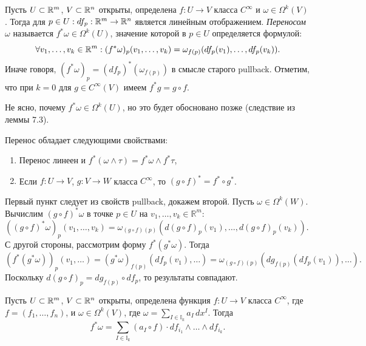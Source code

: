 \begin{definition}
	Пусть $U \subset \mathbb{R}^m$, $V \subset \mathbb{R}^n$ открыты, определена $f : U \to V$ класса $C^{\infty}$ и $\omega \in \Omega^k(V)$. 
	Тогда для $p \in U : df_p : \mathbb{R}^m \to \mathbb{R}^n$ является линейным отображением. 
	\textit{Переносом} $\omega$ называется $f^* \omega \in \Omega^k(U)$, значение которой в $p \in U$ определяется формулой: 
	\[\forall v_1, \dotsc, v_k \in \mathbb{R}^m : (f^* \omega)_p (v_1, \dotsc, v_k) = \omega_{f(p)} (df_p(v_1), \dotsc, df_p(v_k)). \]
	Иначе говоря, $(f^* \omega)_p = (df_p)^* (\omega_{f(p)})$ в смысле старого pullback.
	Отметим, что при $k = 0$ для $g \in C^{\infty}(V)$ имеем $f^* g = g \circ f$.
\end{definition}

Не ясно, почему $f^* \omega \in \Omega^k(U)$, но это будет обосновано позже (следствие из леммы 7.3).

\begin{note}
	Перенос обладает следующими свойствами:
	\begin{enumerate}[itemsep = 0pt, topsep  =5pt]
		\item Перенос линеен и $f^*(\omega \wedge \tau) = f^* \omega \wedge f^* \tau$, 
		\item Если $f : U \to V$, $g : V \to W$ класса $C^\infty$, то $(g \circ f)^* = f^* \circ g^*$.
	\end{enumerate}
\end{note}

\begin{myproof}
	Первый пункт следует из свойств pullback, докажем второй.
	Пусть $\omega \in \Omega^k(W)$. Вычислим $(g \circ f)^* \omega$ в точке $p \in U$ на $v_1, \dots, v_k \in \mathbb{R}^m$:
	$((g \circ f)^* \omega)_p (v_1, \dotsc, v_k) = \omega_{(g \circ f)(p)} (d(g \circ f)_p(v_1), \dotsc, d(g \circ f)_p(v_k))$. 
	С другой стороны, рассмотрим форму $f^* (g^* \omega)$. Тогда
	\[ (f^* (g^* \omega))_p (v_1, \dots) = (g^* \omega)_{f(p)} (df_p(v_1), \dots) = \omega_{(g \circ f)(p)} (dg_{f(p)}(df_p(v_1)), \dots). \]
	Поскольку $d(g \circ f)_p = dg_{f(p)} \circ df_p$, то результаты совпадают.
\end{myproof}


\begin{lemma}
	Пусть $U \subset \mathbb{R}^m$, $V \subset \mathbb{R}^n$ открыты, определена функция $f : U \to V$ класса $C^{\infty}$, где $f = (f_1, \dotsc, f_n)$, и $\omega \in \Omega^k(V)$, где $\omega = \sum_{I \in \mathbb{I}_k} a_I \, dx^I$.
	Тогда 
	\[ f^* \omega = \sum_{I \in \mathbb{I}_k} (a_I \circ f) \cdot df_{i_1} \wedge \dotsc \wedge df_{i_k}. \]
\end{lemma}

